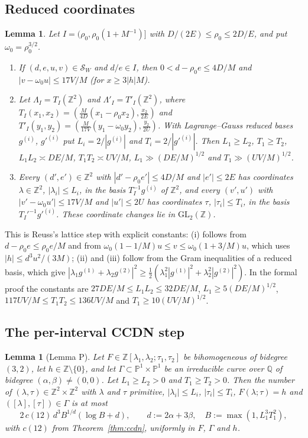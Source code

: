 \documentclass[11pt,reqno]{amsart}
\newtheorem{lemma}[theorem]{Lemma}
\theoremstyle{definition}
\theoremstyle{remark}
\numberwithin{equation}{section}
\newcommand{\Z}{\mathbb Z}
\newcommand{\Q}{\mathbb Q}
\newcommand{\PP}{\mathbb P}
\begin{document}
\subsection{Reduced coordinates}\label{sec:reduced}
\begin{lemma}\label{lem:reduced}
Let $I=(\rho_0,\rho_0(1+M^{-1})]$ with $D/(2E)\le\rho_0\le 2D/E$, and put
$\omega_0=\rho_0^{3/2}$.
\begin{enumerate}[label=\textup{(\roman*)}]
\item If $(d,e,u,v)\in\mathcal S_W$ and $d/e\in I$, then
$0<d-\rho_0e\le 4D/M$ and $|v-\omega_0u|\le17V/M$ (for $x\ge3|h|M$).
\item Let $\Lambda_I=T_I(\Z^2)$ and $\Lambda'_I=T'_I(\Z^2)$, where
$T_I(x_1,x_2)=(\frac{M}{4D}(x_1-\rho_0x_2),\frac{x_2}{2E})$ and
$T'_I(y_1,y_2)=(\frac{M}{17V}(y_1-\omega_0y_2),\frac{y_2}{2U})$. With
Lagrange--Gauss reduced bases $g^{(i)}$, $g'^{(i)}$ put $L_i=2/|g^{(i)}|$ and
$T_i=2/|g'^{(i)}|$. Then $L_1\ge L_2$, $T_1\ge T_2$, $L_1L_2\asymp DE/M$,
$T_1T_2\asymp UV/M$, $L_1\gg(DE/M)^{1/2}$ and $T_1\gg(UV/M)^{1/2}$.
\item Every $(d',e')\in\Z^2$ with $|d'-\rho_0e'|\le4D/M$ and $|e'|\le2E$
has coordinates $\lambda\in\Z^2$, $|\lambda_i|\le L_i$, in the basis
$T_I^{-1}g^{(i)}$ of $\Z^2$, and every $(v',u')$ with
$|v'-\omega_0u'|\le17V/M$ and $|u'|\le2U$ has coordinates $\tau$,
$|\tau_i|\le T_i$, in the basis $T_I'^{-1}g'^{(i)}$. These coordinate changes
lie in $\mathrm{GL}_2(\Z)$.
\end{enumerate}
\end{lemma}
This is Reuss's lattice step \cite[\S2.2]{Reuss} with explicit constants:
(i) follows from $d-\rho_0e\le\rho_0e/M$ and from
$\omega_0(1-1/M)u\le v\le\omega_0(1+3/M)u$, which uses $|h|\le d^3u^2/(3M)$;
(ii) and (iii) follow from the Gram inequalities of a reduced basis, which
give $|\lambda_1g^{(1)}+\lambda_2g^{(2)}|^2\ge\frac12(\lambda_1^2|g^{(1)}|^2+\lambda_2^2|g^{(2)}|^2)$.
In the formal proof the constants are $27DE/M\le L_1L_2\le32DE/M$,
$L_1\ge5(DE/M)^{1/2}$, $117UV/M\le T_1T_2\le136UV/M$ and
$T_1\ge10(UV/M)^{1/2}$.

\subsection{The per-interval CCDN step}\label{sec:P}
\begin{lemma}[Lemma P]\label{lem:P}
Let $F\in\Z[\lambda_1,\lambda_2;\tau_1,\tau_2]$ be bihomogeneous of bidegree
$(3,2)$, let $h\in\Z\setminus\{0\}$, and let $\Gamma\subset\PP^1\times\PP^1$ be
an irreducible curve over $\Q$ of bidegree $(\alpha,\beta)\ne(0,0)$. Let
$L_1\ge L_2>0$ and $T_1\ge T_2>0$. Then the number of
$(\lambda,\tau)\in\Z^2\times\Z^2$ with $\lambda$ and $\tau$ primitive,
$|\lambda_i|\le L_i$, $|\tau_i|\le T_i$, $F(\lambda;\tau)=h$ and
$([\lambda],[\tau])\in\Gamma$ is at most
\[
2\,c(12)\,d^3B^{1/d}(\log B+d),\qquad d:=2\alpha+3\beta,\quad B:=\max(1,L_1^3T_1^2),
\]
with $c(12)$ from Theorem~\ref{thm:ccdn}, uniformly in $F$, $\Gamma$ and $h$.
\end{lemma}
\end{document}
